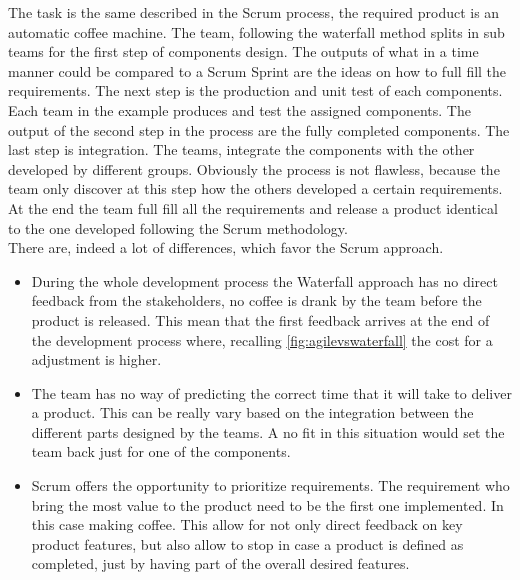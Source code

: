 \documentclass[../main.tex]{subfiles}
\begin{document}
The task is the same described in the Scrum process, the required product is an automatic coffee machine. The team, following the waterfall method splits in sub teams for the first step of components design. The outputs of what in a time manner could be compared to a Scrum Sprint are the ideas on how to full fill the requirements. The next step is the production and unit test of each components. Each team in the example produces and test the assigned components. The output of the second step in the process are the fully completed components. The last step is integration. The teams, integrate the components with the other developed by different groups. Obviously the process is not flawless, because the team only discover at this step how the others developed a certain requirements. At the end the team full fill all the requirements and release a product identical to the one developed following the Scrum methodology.\\ There are, indeed a lot of differences, which favor the Scrum approach.
\begin{itemize}
    \item During the whole development process the Waterfall approach has no direct feedback from the stakeholders, no coffee is drank by the team before the product is released. This mean that the first feedback arrives at the end of the development process where, recalling \ref{fig:agilevswaterfall} the cost for a adjustment is higher. 
    \item The team has no way of predicting the correct time that it will take to deliver a product. This can be really vary based on the integration between the different parts designed by the teams. A no fit in this situation would set the team back just for one of the components. 
    \item Scrum offers the opportunity to prioritize requirements. The requirement who bring the most value to the product need to be the first one implemented. In this case making coffee. This allow for not only direct feedback on key product features, but also allow to stop in case a product is defined as completed, just by having part of the overall desired features. 
\end{itemize}
\cleardoublepage
\end{document}

